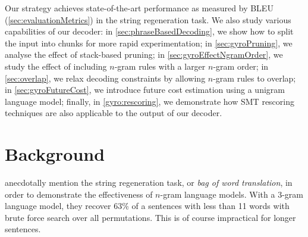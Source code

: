 Our strategy achieves state-of-the-art performance as
measured by BLEU (\autoref{sec:evaluationMetrics}) in the string regeneration
task. We also study various capabilities of our decoder: in
\autoref{sec:phraseBasedDecoding}, we show how to
split the input into chunks for more rapid experimentation;
in \autoref{sec:gyroPruning}, we analyse the effect of stack-based pruning;
in \autoref{sec:gyroEffectNgramOrder}, we study
the effect of including $n$-gram rules with a larger $n$-gram order;
in \autoref{sec:overlap}, we relax decoding constraints by allowing
$n$-gram rules to overlap; in \autoref{sec:gyroFutureCost}, we introduce
future cost estimation using a unigram language model; finally, in
\autoref{gyro:rescoring}, we demonstrate how SMT rescoring techniques
are also applicable to the output of our decoder.



\section{Background}
\label{sec:gyroBackground}


\citet{brown-cocke-dellapietra-dellapietra-jelinek-lafferty-mercer-roossin:1990:CL}
anecdotally mention the string regeneration task, or \emph{bag of word translation},
in order to demonstrate the effectiveness
of $n$-gram language models. With a 3-gram language model, they recover
63\% of a sentences with less than 11 words with brute force search
over all permutations. This is of course impractical for longer
sentences. %

